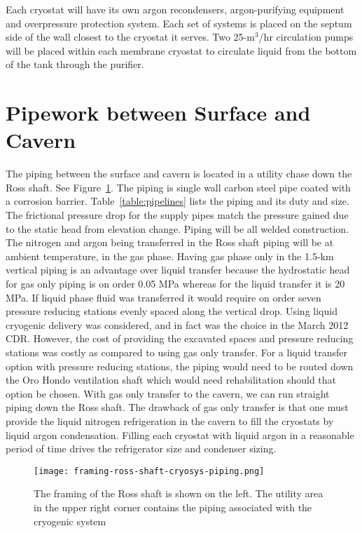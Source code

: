 Each cryostat will have its own argon recondensers, argon-purifying equipment and
overpressure protection system.
Each set of systems is
placed on the septum side of the wall
closest to the cryostat it serves. Two 25-m$^3$/hr circulation pumps will be placed within each
membrane cryostat to circulate liquid from the bottom of the tank through the purifier.


\section{Pipework between Surface and Cavern}
\label{sec:pipework-surface-cav}

The piping between the
surface and cavern is located in a utility chase down the Ross shaft.
See Figure~\ref{fig:framing-at-ross-piping}. The piping is single wall carbon steel pipe coated with a corrosion barrier. 
Table~\ref{table:pipelines} lists the piping and its duty and size. The frictional pressure drop for the supply pipes match
the pressure gained due to the static head
from elevation change. Piping will be all welded
construction. The nitrogen and argon being transferred in the Ross shaft piping will be at
ambient temperature, in the gas phase. Having gas phase only in the 1.5-km vertical piping is
an advantage over liquid transfer because the hydrostatic head for gas only piping is on order
0.05 MPa whereas for the liquid transfer it is 20 MPa. If liquid phase fluid was transferred it
would require on order
seven pressure reducing stations evenly spaced along the vertical drop.
Using liquid cryogenic delivery was considered, and in fact was the choice in the March 2012
CDR. However, the cost of providing the excavated spaces and pressure reducing stations
was costly as compared to using gas only transfer. For a liquid transfer option with pressure
reducing stations, the piping would need to be routed down the Oro Hondo ventilation shaft
which would need rehabilitation should that option be chosen. With gas only transfer to the
cavern, we can run straight piping down the Ross shaft. The drawback of gas only transfer is
that one must provide the liquid nitrogen refrigeration in the cavern to fill the cryostats by
liquid argon condensation. Filling each cryostat with liquid argon in a reasonable
period of time drives the refrigerator size and condenser sizing.

\begin{figure}[htbp]
\centering
\texttt{[image: framing-ross-shaft-cryosys-piping.png]} 
\caption{ The framing of the Ross shaft is shown on the left. The utility area in the upper
right corner contains the piping
associated with the cryogenic system}
\label{fig:framing-at-ross-piping}
\end{figure}

